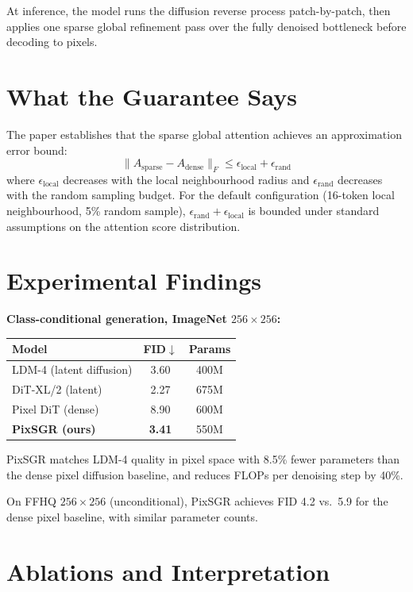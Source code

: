 \documentclass[10pt,twocolumn]{article}
\begin{document}
At inference, the model runs the diffusion reverse process patch-by-patch,
then applies one sparse global refinement pass over the fully denoised
bottleneck before decoding to pixels.

\section{What the Guarantee Says}

The paper establishes that the sparse global attention achieves an
approximation error bound:
\[
  \|A_\mathrm{sparse} - A_\mathrm{dense}\|_F \leq
  \epsilon_\mathrm{local} + \epsilon_\mathrm{rand}
\]
where $\epsilon_\mathrm{local}$ decreases with the local neighbourhood
radius and $\epsilon_\mathrm{rand}$ decreases with the random sampling
budget. For the default configuration (16-token local neighbourhood,
5\% random sample), $\epsilon_\mathrm{rand} + \epsilon_\mathrm{local}$
is bounded under standard assumptions on the attention score distribution.

\section{Experimental Findings}

\textbf{Class-conditional generation, ImageNet $256\times256$:}

\begin{center}
\begin{tabular}{lcc}
\toprule
Model & FID$\downarrow$ & Params \\
\midrule
LDM-4 (latent diffusion) & 3.60 & 400M \\
DiT-XL/2 (latent)        & 2.27 & 675M \\
Pixel DiT (dense)        & 8.90 & 600M \\
\textbf{PixSGR (ours)}   & \textbf{3.41} & 550M \\
\bottomrule
\end{tabular}
\end{center}

PixSGR matches LDM-4 quality in pixel space with 8.5\% fewer parameters
than the dense pixel diffusion baseline, and reduces FLOPs per denoising
step by 40\%.

On FFHQ $256\times256$ (unconditional), PixSGR achieves FID 4.2
vs.\ 5.9 for the dense pixel baseline, with similar parameter counts.

\section{Ablations and Interpretation}
\end{document}
